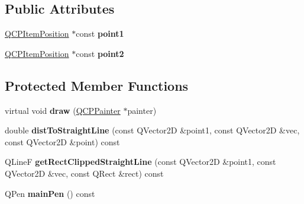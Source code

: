 \subsection*{\-Public \-Attributes}
\begin{DoxyCompactItemize}
\item 
\hypertarget{classQCPItemStraightLine_ac131a6ffe456f2cc7364dce541fe0120}{\hyperlink{classQCPItemPosition}{\-Q\-C\-P\-Item\-Position} $\ast$const {\bfseries point1}}\label{classQCPItemStraightLine_ac131a6ffe456f2cc7364dce541fe0120}

\item 
\hypertarget{classQCPItemStraightLine_ad26c0a732e471f63f75d481dcd48cfc9}{\hyperlink{classQCPItemPosition}{\-Q\-C\-P\-Item\-Position} $\ast$const {\bfseries point2}}\label{classQCPItemStraightLine_ad26c0a732e471f63f75d481dcd48cfc9}

\end{DoxyCompactItemize}
\subsection*{\-Protected \-Member \-Functions}
\begin{DoxyCompactItemize}
\item 
\hypertarget{classQCPItemStraightLine_a2daa1e1253216c26565d56a2d5530170}{virtual void {\bfseries draw} (\hyperlink{classQCPPainter}{\-Q\-C\-P\-Painter} $\ast$painter)}\label{classQCPItemStraightLine_a2daa1e1253216c26565d56a2d5530170}

\item 
\hypertarget{classQCPItemStraightLine_adc9b6c5bd33c7f806b748b79dfa25926}{double {\bfseries dist\-To\-Straight\-Line} (const \-Q\-Vector2\-D \&point1, const \-Q\-Vector2\-D \&vec, const \-Q\-Vector2\-D \&point) const }\label{classQCPItemStraightLine_adc9b6c5bd33c7f806b748b79dfa25926}

\item 
\hypertarget{classQCPItemStraightLine_af18ac29577b5b96fece15b0ffea70177}{\-Q\-Line\-F {\bfseries get\-Rect\-Clipped\-Straight\-Line} (const \-Q\-Vector2\-D \&point1, const \-Q\-Vector2\-D \&vec, const \-Q\-Rect \&rect) const }\label{classQCPItemStraightLine_af18ac29577b5b96fece15b0ffea70177}

\item 
\hypertarget{classQCPItemStraightLine_a63ef39814c5b560dbb7b13e3fec1d940}{\-Q\-Pen {\bfseries main\-Pen} () const }\label{classQCPItemStraightLine_a63ef39814c5b560dbb7b13e3fec1d940}

\end{DoxyCompactItemize}
